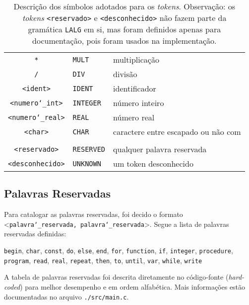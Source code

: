 \begin{table}[h]
\begin{center}
\begin{tabular}{|c||l|l|}
		\texttt{*}                   & \texttt{MULT}      & multiplicação\\
		\texttt{/}                   & \texttt{DIV}       & divisão\\
		\texttt{<ident>}             & \texttt{IDENT}     & identificador\\
		\texttt{<numero\char`_int>}  & \texttt{INTEGER}   & número inteiro\\
		\texttt{<numero\char`_real>} & \texttt{REAL}      & número real\\
		\texttt{<char>}              & \texttt{CHAR}      & caractere entre \texttt{\textquotesingle} escapado ou não com \texttt{\char`\\}\\
		\texttt{<reservado>}         & \texttt{RESERVED}  & qualquer palavra reservada\\
		\texttt{<desconhecido>}      & \texttt{UNKNOWN}   & um token desconhecido\\
		\hline
	\end{tabular}
	\caption{Descrição dos símbolos adotados para os \textit{tokens}. \indent Observação: os \textit{tokens} \texttt{<reservado>} e \texttt{<desconhecido>} não fazem parte da gramática \texttt{LALG} em si, mas foram definidos apenas para documentação, pois foram usados na implementação\label{tab:tokens}.}
\end{center}
\end{table}

\subsection{Palavras Reservadas}

Para catalogar as palavras reservadas, foi decido o formato\\ \textless\texttt{palavra\char`_reservada, palavra\char`_reservada}\textgreater. Segue a lista de palavras reservadas definidas:

\texttt{begin}, \texttt{char}, \texttt{const}, \texttt{do}, \texttt{else}, \texttt{end}, \texttt{for}, \texttt{function}, \texttt{if}, \texttt{integer}, \texttt{procedure}, \texttt{program}, \texttt{read}, \texttt{real}, \texttt{repeat}, \texttt{then}, \texttt{to}, \texttt{until}, \texttt{var}, \texttt{while}, \texttt{write}	

A tabela de palavras reservadas foi descrita diretamente no código-fonte (\textit{hard-coded}) para melhor desempenho e em ordem alfabética. Mais informações estão documentadas no arquivo \texttt{./src/main.c}.

